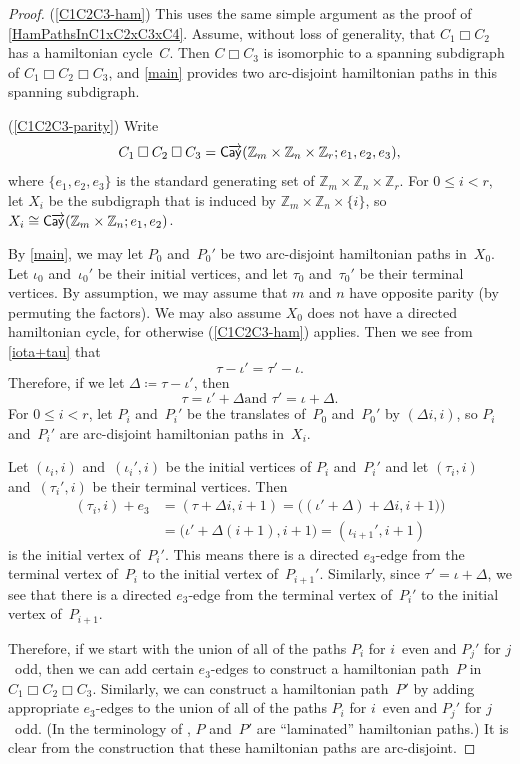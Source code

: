 \documentclass[11pt]{amsart}
\theoremstyle{definition}
\numberwithin{case}{startcases}
\numberwithin{equation}{section}
\newcommand{\Z}{\mathbb{Z}}  %
\newcommand{\cartprod}{\mathbin{\Box}}
\newcommand{\cayd}{\mathop{\mathsf{C}\mkern-1mu\overrightarrow{\mathsf{ay}}}}
\begin{document}
	\begin{proof}
		(\ref{C1C2C3-ham}) This uses the same simple argument as the proof of \cref{HamPathsInC1xC2xC3xC4}. Assume, without loss of generality, that $C_1 \cartprod C_2$ has a hamiltonian cycle~$C$. Then $C \cartprod C_3$ is isomorphic to a spanning subdigraph of $C_1 \cartprod C_2 \cartprod C_3$, and \cref{main} provides two arc-disjoint hamiltonian paths in this spanning subdigraph.
		
		(\ref{C1C2C3-parity}) Write 
		\[ C_1 \cartprod C_2 \cartprod C_3 = \cayd(\Z_m \times \Z_n \times \Z_r; e_1, e_2, e_3) , \]
		where $\{e_1, e_2, e_3\}$ is the standard generating set of $\Z_m \times \Z_n \times \Z_r$.
		For $0 \le i < r$, let $X_i$ be the subdigraph that is induced by $\Z_m \times \Z_n \times \{i\}$, so $X_i \cong \cayd(\Z_m \times \Z_n; e_1, e_2)$.
		
		By \cref{main}, we may let $P_0$ and~$P_0'$ be two arc-disjoint hamiltonian paths in~$X_0$. Let $\iota_0$ and~$\iota_0'$ be their initial vertices, and let $\tau_0$ and~$\tau_0'$ be their terminal vertices.
		By assumption, we may assume that $m$ and $n$ have opposite parity (by permuting the factors). We may also assume $X_0$ does not have a directed hamiltonian cycle, for otherwise (\ref{C1C2C3-ham}) applies. Then we see from \cref{iota+tau} that
		\[ \tau - \iota' = \tau' - \iota . \]
		Therefore, if we let $\Delta \coloneqq \tau - \iota'$, then     \[ \text{$\tau = \iota' + \Delta$
			\ and \ 
			$\tau' = \iota + \Delta$} . \]
		For $0 \le i < r$, let $P_i$ and~$P_i'$ be the translates of~$P_0$ and~$P_0'$ by $(\Delta i, i)$, so $P_i$ and~$P_i'$ are arc-disjoint hamiltonian paths in~$X_i$.
		
		Let $(\iota_i, i)$ and~$(\iota_i', i)$ be the initial vertices of $P_i$ and~$P_i'$ and let $(\tau_i, i)$ and~$(\tau_i', i)$ be their terminal vertices. Then 
		\begin{align*}
			(\tau_i, i) + e_3
			&= (\tau + \Delta i, i + 1)
			= \bigl( (\iota' + \Delta) + \Delta i, i + 1 \bigr))
			\\&= \bigl( \iota' + \Delta (i + 1), i + 1 \bigr) 
			= (\iota_{i+1}', i + 1)
		\end{align*} 
		is the initial vertex of~$P_i'$.  This means there is a directed $e_3$-edge from the terminal vertex of~$P_i$ to the initial vertex of~$P_{i+1}'$. 
		Similarly, since $\tau' = \iota + \Delta$, we see that there is a directed $e_3$-edge from the terminal vertex of~$P_i'$ to the initial vertex of~$P_{i+1}$.
		
		Therefore, if we start with the union of all of the paths $P_i$ for $i$~even and $P_j'$ for $j$~odd, then we can add certain $e_3$-edges to construct a hamiltonian path~$P$ in $C_1 \cartprod C_2 \cartprod C_3$. Similarly, we can construct a hamiltonian path~$P'$ by adding appropriate  $e_3$-edges to the union of all of the paths $P_i$ for $i$~even and $P_j'$ for $j$~odd. (In the terminology of \cite[Defn.~9.4]{Curran}, $P$ and~$P'$ are ``laminated'' hamiltonian paths.) It is clear from the construction that these hamiltonian paths are arc-disjoint.
		

\end{proof}
\end{document}
